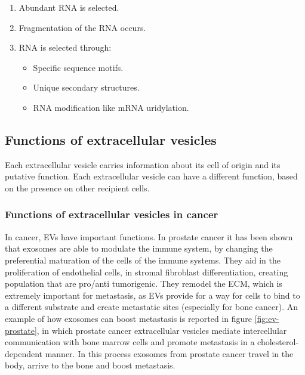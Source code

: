             \begin{multicols}{2}
                \begin{enumerate}
                    \item Abundant RNA is selected.
                    \item Fragmentation of the RNA occurs.
                    \item RNA is selected through:

                        \begin{itemize}
                            \item Specific sequence motifs.
                            \item Unique secondary structures.
                            \item RNA modification like mRNA uridylation.
                        \end{itemize}

                \end{enumerate}
            \end{multicols}

    \subsection{Functions of extracellular vesicles}
    Each extracellular vesicle carries information about its cell of origin and its putative function.
    Each extracellular vesicle can have a different function, based on the presence on other recipient cells.

        \subsubsection{Functions of extracellular vesicles in cancer}
        In cancer, EVs have important functions.
        In prostate cancer it has been shown that exosomes are able to modulate the immune system, by changing the preferential maturation of the cells of the immune systems.
        They aid in the proliferation of endothelial cells, in stromal fibroblast differentiation, creating population that are pro/anti tumorigenic.
        They remodel the ECM, which is extremely important for metastasis, as EVs provide for a way for cells to bind to a different substrate and create metastatic sites (especially for bone cancer).
        An example of how exosomes can boost metastasis is reported in figure \ref{fig:ev-prostate}, in which prostate cancer extracellular vesicles mediate intercellular communication with bone marrow cells and promote metastasis in a cholesterol-dependent manner.
        In this process exosomes from prostate cancer travel in the body, arrive to the bone and boost metastasis.

